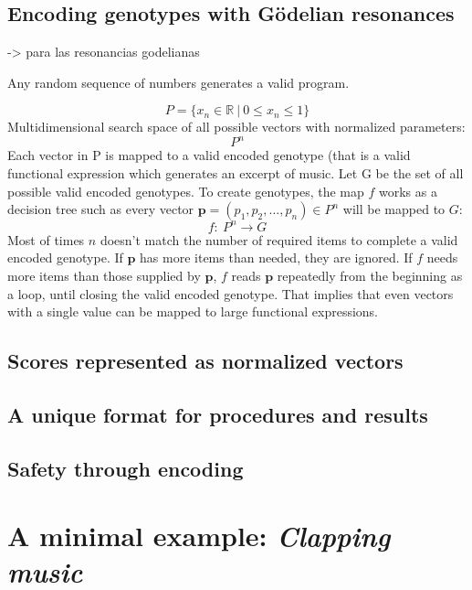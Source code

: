 \documentclass{article}
\renewcommand{\vec}[1]{\mathbf{#1}}
\begin{document}
\subsection{Encoding genotypes with G{\"o}delian resonances}

{\color{red}

\cite{deLemosAlmada2017} -> para las resonancias godelianas

}


Any random sequence of numbers generates a valid program. 

$$ P = \{x_n \in \mathbb{R} \: | \: 0 \leq x_n \leq1 \} $$
Multidimensional search space of all possible vectors with normalized parameters:
$$ P^n $$
Each vector in P is mapped to a valid encoded genotype (that is a valid functional expression which generates an excerpt of music.
Let G be the set of all possible valid encoded genotypes. To create genotypes, the map $f$ works as a decision tree such as every vector $\vec{p} = (p_1, p_2, ..., p_n) \in P^n$ will be mapped to $G$: 
$$f:\ P^n\to G$$
Most of times $n$ doesn't match the number of required items to complete a valid encoded genotype. If $\vec{p}$ has more items than needed, they are ignored. If $f$ needs more items than those supplied by $\vec{p}$, $f$ reads $\vec{p}$ repeatedly from the beginning as a loop, until closing the valid encoded genotype. That implies that even vectors with a single value can be mapped to large functional expressions.  



\subsection{Scores represented as normalized vectors}
\subsection{A unique format for procedures and results}
\subsection{Safety through encoding}








\section{A minimal example: \textsl{Clapping music}}
\end{document}
